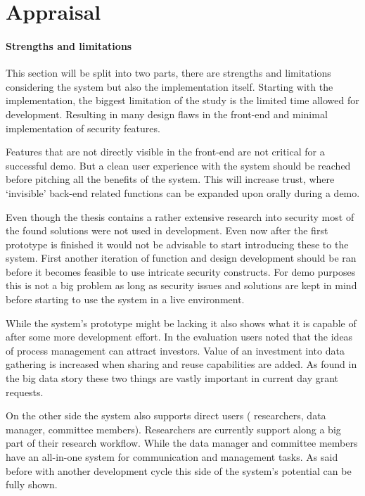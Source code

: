 \section{Appraisal}

\paragraph{Strengths and limitations}
This section will be split into two parts, there are strengths and limitations considering the system but also the implementation itself.
Starting with the implementation, the biggest limitation of the study is the limited time allowed for development.
Resulting in many design flaws in the front-end and minimal implementation of security features.

Features that are not directly visible in the front-end are not critical for a successful demo.
But a clean user experience with the system should be reached before pitching all the benefits of the system.
This will increase trust, where `invisible' back-end related functions can be expanded upon orally during a demo.

Even though the thesis contains a rather extensive research into security most of the found solutions were not used in development.
Even now after the first prototype is finished it would not be advisable to start introducing these to the system.
First another iteration of function and design development should be ran before it becomes feasible to use intricate security constructs.
For demo purposes this is not a big problem as long as security issues and solutions are kept in mind before starting to use the system in a live environment.

While the system's prototype might be lacking it also shows what it is capable of after some more development effort.
In the evaluation users noted that the ideas of process management can attract investors.
Value of an investment into data gathering is increased when sharing and reuse capabilities are added.
As found in the big data story these two things are vastly important in current day grant requests.

On the other side the system also supports direct users (\ie{} researchers, data manager, committee members).
Researchers are currently support along a big part of their research workflow.
While the data manager and committee members have an all-in-one system for communication and management tasks.
As said before with another development cycle this side of the system's potential can be fully shown.


